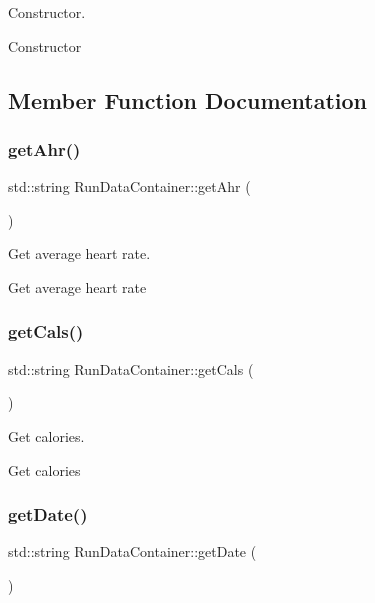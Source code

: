Constructor. 

Constructor 

\subsection{Member Function Documentation}
\mbox{\label{classRunDataContainer_a978ce6398408f438b78acb6ddffcb83e}} 
\subsubsection{\texorpdfstring{getAhr()}{getAhr()}}
{\footnotesize\ttfamily std\+::string Run\+Data\+Container\+::get\+Ahr (\begin{DoxyParamCaption}{ }\end{DoxyParamCaption})}



Get average heart rate. 

Get average heart rate \mbox{\label{classRunDataContainer_a0b3486627bcfb6b5043035a7446139aa}} 
\subsubsection{\texorpdfstring{getCals()}{getCals()}}
{\footnotesize\ttfamily std\+::string Run\+Data\+Container\+::get\+Cals (\begin{DoxyParamCaption}{ }\end{DoxyParamCaption})}



Get calories. 

Get calories \mbox{\label{classRunDataContainer_a73c931d83657e6ec55599e4bf81cf6dc}} 
\subsubsection{\texorpdfstring{getDate()}{getDate()}}
{\footnotesize\ttfamily std\+::string Run\+Data\+Container\+::get\+Date (\begin{DoxyParamCaption}{ }\end{DoxyParamCaption})}



